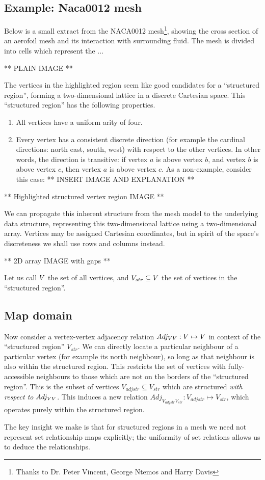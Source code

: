 \subsection{Example: Naca0012 mesh}
Below is a small extract from the NACA0012 mesh\footnote{Thanks to Dr. Peter Vincent, George Ntemos and Harry Davis}, showing the cross section of an aerofoil mesh and its interaction with surrounding fluid. The mesh is divided into cells which represent the ...

** PLAIN IMAGE **

The vertices in the highlighted region seem like good candidates for a ``structured region'', forming a two-dimensional lattice in a discrete Cartesian space. This ``structured region'' has the following properties.
\begin{enumerate}
\item All vertices have a uniform arity of four.
\item Every vertex has a consistent discrete direction (for example the cardinal directions: north east, south, west) with respect to the other vertices. In other words, the direction is transitive: if vertex $a$ is above vertex $b$, and vertex $b$ is above vertex $c$, then vertex $a$ is above vertex $c$. As a non-example, consider this case:
** INSERT IMAGE AND EXPLANATION **
\end{enumerate}


** Highlighted structured vertex region IMAGE **

We can propagate this inherent structure from the mesh model to the underlying data structure, representing this two-dimensional lattice using a two-dimensional array. Vertices may be assigned Cartesian coordinates, but in spirit of the space's discreteness we shall use rows and columns instead.

** 2D array IMAGE with gaps **


\newcommand{\strV}{V_{str}}
\newcommand{\adjstrV}{V_{adjstr}}
\newcommand{\AdjVVstr}{Adj_{\adjstrV\strV}}

Let us call $V$ the set of all vertices, and $\strV \subseteq \VertexSet$ the set of vertices in the ``structured region''.

\subsection{Map domain}

Now consider a vertex-vertex adjacency relation $Adj_{VV}: V \mapsto V$ in context of the ``structured region'' $\strV$. We can directly locate a particular neighbour of a particular vertex (for example its north neighbour), so long as that neighbour is also within the structured region. This restricts the set of vertices with fully-accessible neighbours to those which are not on the borders of the ``structured region''. This is the subset of vertices $\adjstrV \subseteq \strV$ which are structured \emph{with respect to} $Adj_{VV}$. This induces a new relation $\AdjVVstr: \adjstrV \mapsto \strV$, which operates purely within the structured region.



The key insight we make is that for structured regions in a mesh we need not represent set relationship maps explicitly; the uniformity of set relations allows us to deduce the relationships.